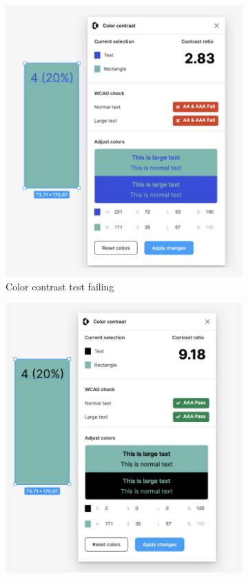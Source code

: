 \documentclass{master_thesis}
\begin{document}
\begin{figure}[ht]
	\centering
	\begin{subfigure}{0.4\textwidth}
		\includegraphics[width=\textwidth]{img/figma plugin-color-contrast-fail.png}
		\caption{Color contrast test failing}
	\end{subfigure}
	\hspace{0.05\textwidth}
	\begin{subfigure}{0.4\textwidth}
		\includegraphics[width=\textwidth]{img/figma plugin-color-contrast-pass.png}

\end{subfigure}
\end{figure}
\end{document}
